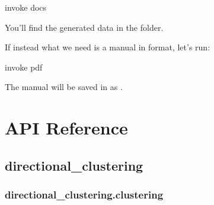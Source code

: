 \documentclass[letterpaper,10pt,english]{sphinxmanual}
\begin{document}
\begin{sphinxVerbatim}[commandchars=\\\{\}]
invoke docs
\end{sphinxVerbatim}

You’ll find the generated  data in the  folder.

If instead what we need is a manual in  format, let’s run:

\begin{sphinxVerbatim}[commandchars=\\\{\}]
invoke pdf
\end{sphinxVerbatim}

The manual will be saved in  as .


\chapter{API Reference}
\label{\detokenize{api:api-reference}}\label{\detokenize{api::doc}}\label{\detokenize{api/directional_clustering:module-directional_clustering}}

\section{directional\_clustering}
\label{\detokenize{api/directional_clustering:directional-clustering}}\label{\detokenize{api/directional_clustering::doc}}\label{\detokenize{api/directional_clustering.clustering:module-directional_clustering.clustering}}

\subsection{directional\_clustering.clustering}
\label{\detokenize{api/directional_clustering.clustering:directional-clustering-clustering}}\label{\detokenize{api/directional_clustering.clustering::doc}}
\end{document}
